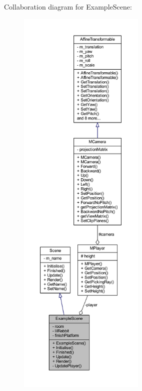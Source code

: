 Collaboration diagram for Example\+Scene\+:\nopagebreak
\begin{figure}[H]
\begin{center}
\leavevmode
\includegraphics[height=550pt]{class_example_scene__coll__graph}
\end{center}
\end{figure}
